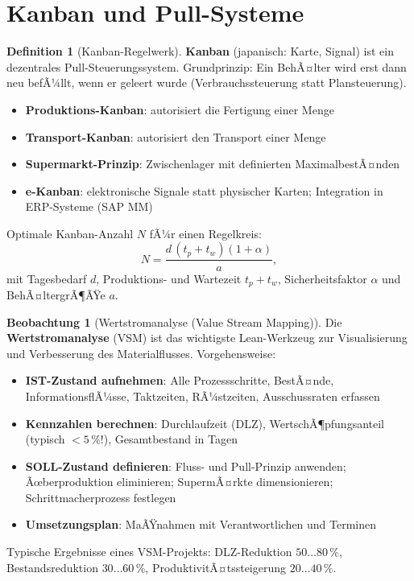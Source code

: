 ﻿\documentclass[a4paper,12pt]{report}
\theoremstyle{definition}
\newtheorem{definition}{Definition}
\newtheorem{beobachtung}{Beobachtung}
\begin{document}
\section{Kanban und Pull-Systeme}

\begin{definition}[Kanban-Regelwerk]
\textbf{Kanban} (japanisch: Karte, Signal) ist ein dezentrales Pull-Steuerungssystem.
Grundprinzip: Ein BehÃ¤lter wird erst dann neu befÃ¼llt, wenn er geleert wurde
(Verbrauchssteuerung statt Plansteuerung).
\begin{itemize}
    \item[-] \textbf{Produktions-Kanban}: autorisiert die Fertigung einer Menge
    \item[-] \textbf{Transport-Kanban}: autorisiert den Transport einer Menge
    \item[-] \textbf{Supermarkt-Prinzip}: Zwischenlager mit definierten MaximalbestÃ¤nden
    \item[-] \textbf{e-Kanban}: elektronische Signale statt physischer Karten;
          Integration in ERP-Systeme (SAP MM)
\end{itemize}
Optimale Kanban-Anzahl $N$ fÃ¼r einen Regelkreis:
\[
  N = \frac{d\,(t_p + t_w)(1 + \alpha)}{a},
\]
mit Tagesbedarf $d$, Produktions- und Wartezeit $t_p + t_w$,
Sicherheitsfaktor $\alpha$ und BehÃ¤ltergrÃ¶ÃŸe $a$.
\end{definition}

\begin{beobachtung}[Wertstromanalyse (Value Stream Mapping)]
Die \textbf{Wertstromanalyse} (VSM) ist das wichtigste Lean-Werkzeug
zur Visualisierung und Verbesserung des Materialflusses.
Vorgehensweise:
\begin{itemize}
    \item[-] \textbf{IST-Zustand aufnehmen}: Alle Prozessschritte, BestÃ¤nde,
          InformationsflÃ¼sse, Taktzeiten, RÃ¼stzeiten, Ausschussraten erfassen
    \item[-] \textbf{Kennzahlen berechnen}: Durchlaufzeit (DLZ), WertschÃ¶pfungsanteil
          (typisch $< 5\,\%$!), Gesamtbestand in Tagen
    \item[-] \textbf{SOLL-Zustand definieren}: Fluss- und Pull-Prinzip anwenden;
          Ãœberproduktion eliminieren; SupermÃ¤rkte dimensionieren; Schrittmacherprozess festlegen
    \item[-] \textbf{Umsetzungsplan}: MaÃŸnahmen mit Verantwortlichen und Terminen
\end{itemize}
Typische Ergebnisse eines VSM-Projekts: DLZ-Reduktion $50\ldots80\,\%$,
Bestandsreduktion $30\ldots60\,\%$, ProduktivitÃ¤tssteigerung $20\ldots40\,\%$.
\end{beobachtung}
\end{document}
